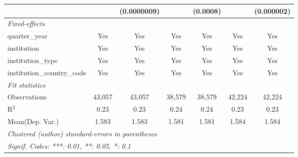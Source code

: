 \begin{tabular}{lcccccc}
                                      &               & (0.0000009)   &               & (0.0008)      &               & (0.000002)\\   
   \midrule
   \emph{Fixed-effects}\\
   quarter\_year                      & Yes           & Yes           & Yes           & Yes           & Yes           & Yes\\  
   institution                        & Yes           & Yes           & Yes           & Yes           & Yes           & Yes\\  
   institution\_type                  & Yes           & Yes           & Yes           & Yes           & Yes           & Yes\\  
   institution\_country\_code         & Yes           & Yes           & Yes           & Yes           & Yes           & Yes\\  
   \midrule
   \emph{Fit statistics}\\
   Observations                       & 43,057        & 43,057        & 38,579        & 38,579        & 42,224        & 42,224\\  
   R$^2$                              & 0.23          & 0.23          & 0.24          & 0.24          & 0.23          & 0.23\\  
Mean(Dep. Var.) & 1.583 & 1.583 & 1.581 & 1.581 & 1.584 & 1.584 \\
   \midrule \midrule
   \multicolumn{7}{l}{\emph{Clustered (author) standard-errors in parentheses}}\\
   \multicolumn{7}{l}{\emph{Signif. Codes: ***: 0.01, **: 0.05, *: 0.1}}\\
\end{tabular}
\par\endgroup
